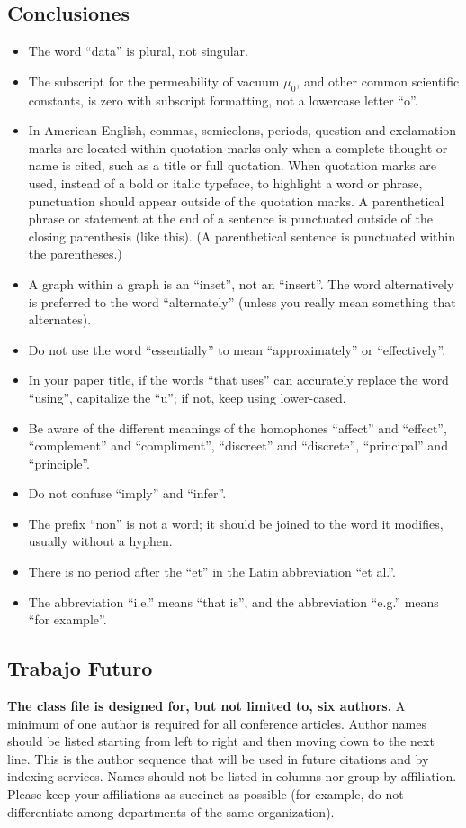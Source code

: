 \documentclass[conference]{IEEEtran}
\begin{document}
\subsection{Conclusiones}
\begin{itemize}
\item The word ``data'' is plural, not singular.
\item The subscript for the permeability of vacuum $\mu_{0}$, and other common scientific constants, is zero with subscript formatting, not a lowercase letter ``o''.
\item In American English, commas, semicolons, periods, question and exclamation marks are located within quotation marks only when a complete thought or name is cited, such as a title or full quotation. When quotation marks are used, instead of a bold or italic typeface, to highlight a word or phrase, punctuation should appear outside of the quotation marks. A parenthetical phrase or statement at the end of a sentence is punctuated outside of the closing parenthesis (like this). (A parenthetical sentence is punctuated within the parentheses.)
\item A graph within a graph is an ``inset'', not an ``insert''. The word alternatively is preferred to the word ``alternately'' (unless you really mean something that alternates).
\item Do not use the word ``essentially'' to mean ``approximately'' or ``effectively''.
\item In your paper title, if the words ``that uses'' can accurately replace the word ``using'', capitalize the ``u''; if not, keep using lower-cased.
\item Be aware of the different meanings of the homophones ``affect'' and ``effect'', ``complement'' and ``compliment'', ``discreet'' and ``discrete'', ``principal'' and ``principle''.
\item Do not confuse ``imply'' and ``infer''.
\item The prefix ``non'' is not a word; it should be joined to the word it modifies, usually without a hyphen.
\item There is no period after the ``et'' in the Latin abbreviation ``et al.''.
\item The abbreviation ``i.e.'' means ``that is'', and the abbreviation ``e.g.'' means ``for example''.
\end{itemize}


\subsection{Trabajo Futuro}
\textbf{The class file is designed for, but not limited to, six authors.} A 
minimum of one author is required for all conference articles. Author names 
should be listed starting from left to right and then moving down to the 
next line. This is the author sequence that will be used in future citations 
and by indexing services. Names should not be listed in columns nor group by 
affiliation. Please keep your affiliations as succinct as possible (for 
example, do not differentiate among departments of the same organization).
\end{document}
